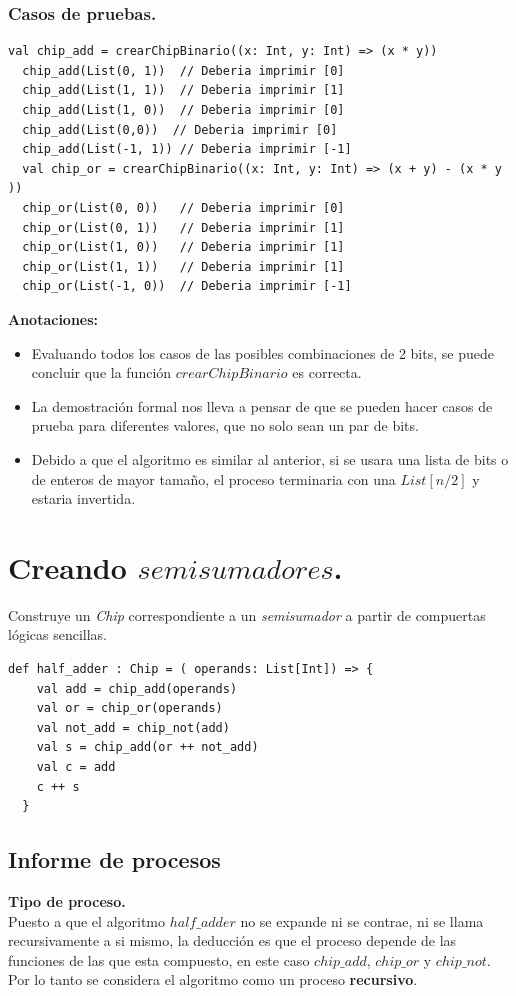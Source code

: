 \documentclass[12pt, a4paper]{article}
\begin{document}
\subsubsection{Casos de pruebas.}
\begin{lstlisting}[style=scalaStyle, caption=Casos de prueba para la función crearChipBinario.]
  val chip_add = crearChipBinario((x: Int, y: Int) => (x * y))
  chip_add(List(0, 1))  // Deberia imprimir [0]
  chip_add(List(1, 1))  // Deberia imprimir [1]
  chip_add(List(1, 0))  // Deberia imprimir [0]
  chip_add(List(0,0))  // Deberia imprimir [0]
  chip_add(List(-1, 1)) // Deberia imprimir [-1]
  val chip_or = crearChipBinario((x: Int, y: Int) => (x + y) - (x * y ))
  chip_or(List(0, 0))   // Deberia imprimir [0]
  chip_or(List(0, 1))   // Deberia imprimir [1]
  chip_or(List(1, 0))   // Deberia imprimir [1]
  chip_or(List(1, 1))   // Deberia imprimir [1]
  chip_or(List(-1, 0))  // Deberia imprimir [-1] 
\end{lstlisting}
\textbf{Anotaciones:}
\begin{itemize}
  \item Evaluando todos los casos de las posibles combinaciones de 2 bits, se puede concluir que la función $crearChipBinario$ es correcta.
  \item La demostración formal nos lleva a pensar  de que se pueden hacer casos de prueba para diferentes valores, que no solo sean un par de bits. 
  \item Debido a que el algoritmo es similar al anterior, si se usara una lista de bits o de enteros de mayor tamaño, el proceso terminaria con una $List[n/2]$ y estaria invertida.
\end{itemize}
\newpage
 \section{Creando $semisumadores$.}
 Construye un \textit{Chip} correspondiente a un \textit{semisumador} a partir de compuertas lógicas sencillas. \\
 \begin{lstlisting}[style=scalaStyle, caption=SemiSumador implementado]
  def half_adder : Chip = ( operands: List[Int]) => {
    val add = chip_add(operands)
    val or = chip_or(operands)
    val not_add = chip_not(add)
    val s = chip_add(or ++ not_add)
    val c = add
    c ++ s 
  }
\end{lstlisting}
 \subsection{Informe de procesos}
  \textbf{Tipo de proceso.} \\
  Puesto a que el algoritmo $half\_adder$ no se expande ni se contrae, ni se llama recursivamente a si mismo, la deducción es que el proceso depende de las funciones de las que esta compuesto, en este caso $chip\_add$, $chip\_or$ y $chip\_not$. \\ 
  Por lo tanto se considera el algoritmo como un proceso \textbf{recursivo}. \\ \\
\end{document}
